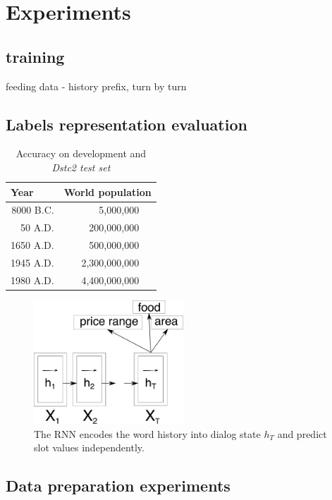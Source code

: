 \documentclass{itatnew}
\begin{document}
\section{Experiments}

\subsection{training}
feeding data - history prefix, turn by turn

\subsection{Labels representation evaluation}

\begin{table}
\caption{Accuracy on development and {\it Dstc2 test set }}
\begin{center}
\begin{tabular}{r@{\quad}rl}
\hline
\multicolumn{1}{l}{\rule{0pt}{12pt}
                   Year}&\multicolumn{2}{l}{World population}\\[2pt]
\hline\rule{0pt}{12pt}
8000 B.C.  &     5,000,000& \\
  50 A.D.  &   200,000,000& \\
1650 A.D.  &   500,000,000& \\
1945 A.D.  & 2,300,000,000& \\
1980 A.D.  & 4,400,000,000& \\[2pt]
\hline
\end{tabular}
\end{center}
\end{table}


\begin{figure}
\includegraphics[width=0.5\textwidth]{encoder}
\caption{The RNN encodes the word history into dialog state $h_T$ and predict slot values independently.}
\end{figure}

\subsection{Data preparation experiments}
\end{document}

